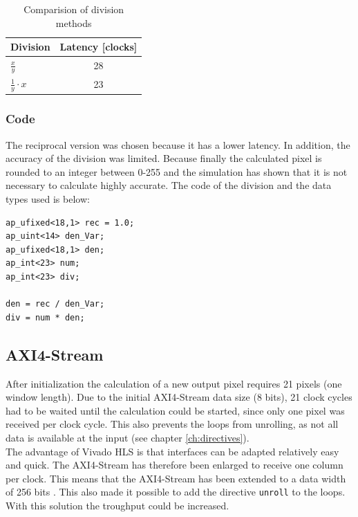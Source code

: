 \begin{table}[tb!]
    \centering
    \begin{tabular}{l c}
        \toprule
        Division & Latency [clocks]  \\
        \midrule
        $\frac{x}{y}$ & 28 
        \\
        $\frac{1}{y} \cdot x$ & 23 
        \\
        \bottomrule
    \end{tabular}
    \caption{Comparision of division methods}
    \label{tab:c_div}
\end{table}

\subsubsection*{Code}
The reciprocal version was chosen because it has a lower latency. In addition,
the accuracy of the division was limited. Because finally the calculated pixel
is rounded to an integer between 0-255 and the simulation has shown that it is
not necessary to calculate highly accurate. The code of the division and the data types used is below:

\begin{minipage}{\textwidth}
\begin{lstlisting}[style=CStyle, caption=Calculation of the division for the Wallis filter, label=lst:division]
ap_ufixed<18,1> rec = 1.0;
ap_uint<14> den_Var;
ap_ufixed<18,1> den;
ap_int<23> num;
ap_int<23> div;

den = rec / den_Var;
div = num * den;
\end{lstlisting}
\end{minipage}


\subsection{AXI4-Stream} \label{ch:ip:axi}
After initialization the calculation of a new output pixel
requires 21 pixels (one window length). Due to the initial AXI4-Stream data size
(8 bits), 21 clock cycles had to be waited until the calculation could be
started, since only one pixel was received per clock cycle. This also prevents
the loops from unrolling, as not all data is available at the input (see chapter \ref{ch:directives}). \\
The advantage of Vivado HLS is that interfaces can be adapted relatively easy
and quick. The AXI4-Stream has therefore been enlarged to receive one column per
clock. This means that the AXI4-Stream has been extended to a data width of 256
bits \cite{axi_stream}. This also made it possible to add the directive 
\texttt{unroll} to the loops. With this solution the troughput could be
increased.

